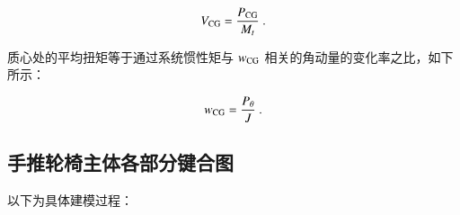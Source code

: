 	\begin{equation}
	\label{equ:V_CG}
	V_{\rm{CG}}
	=
	\frac{P_{\rm{CG}}}{M_t}
	\ .
	\end{equation}
	
	质心处的平均扭矩等于通过系统惯性矩与 $ w_{\rm{CG}} $ 相关的角动量的变化率之比，如下所示：
	
	\begin{equation}
	\label{equ:w_CG}
	w_{\rm{CG}}
	=
	\frac{P_{\theta}}{J}
	\ .
	\end{equation}

\subsection{手推轮椅主体各部分键合图}

	以下为具体建模过程：
	
